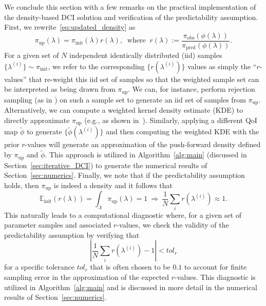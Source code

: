 \documentclass{article}
\newcommand{\tmw}[1]{{\color{red} #1}}
\newcommand{\pspace}{\Lambda}
\newcommand{\initdens}{\pi_{\text{init}}}
\newcommand{\updatedens}{\pi_{\text{up}}}
\newcommand{\predictdens}{\pi_\text{pred}}
\newcommand{\obsdens}{\pi_{\text{obs}}}
\begin{document}
We conclude this section with a few remarks on the practical implementation of the density-based DCI solution and verification 
of the predictability assumption.
First, we rewrite~\eqref{eq:updated_density} as 
\begin{equation}\label{eq:updated_density_r}
    \updatedens(\lambda) = \initdens(\lambda) r(\lambda), \ \text{ where } \ r(\lambda) := \frac{\obsdens(\phi(\lambda))}{\predictdens(\phi(\lambda))}.
\end{equation}
For a given set of $N$ independent identically distributed (iid) samples $\{\lambda^{(i)}\}\sim\initdens$, we refer to the corresponding $\{r(\lambda^{(i)})\}$ values as simply the ``$r$-values'' that re-weight this iid set of samples so that the weighted sample set can be interpreted as being drawn from $\updatedens$.
We can, for instance, perform rejection sampling (as in \cite{BJW18a}) on such a sample set to generate an iid set of samples from $\updatedens$.
Alternatively, we can compute a weighted kernel density estimate (KDE) to directly approximate $\updatedens$ (e.g., as shown in~\cite{RHB25}).
Similarly, applying a different QoI map $\tilde{\phi}$ to generate $\{\tilde{\phi}(\lambda^{(i)})\}$ and then computing the weighted KDE with the prior $r$-values will generate an approximation of the push-forward density defined by $\updatedens$ and $\tilde{\phi}$. 
This approach is utilized in Algorithm~\ref{alg:main} (discussed in Section~\ref{sec:iterative_DCI}) to generate the numerical results of Section~\ref{sec:numerics}.
Finally, we note that if the predictability assumption holds, then $\updatedens$ is indeed a density and it follows that
\begin{equation}
     \mathbb{E}_\text{init}(r(\lambda)) = \int_\pspace \updatedens(\lambda) = 1 \ \Rightarrow \ \frac{1}{N}\sum_i r(\lambda^{(i)}) \approx 1.
\end{equation}
This naturally leads to a computational diagnostic where, for a given set of parameter samples and associated $r$-values, we check the validity of the predictability assumption by verifying that
\begin{equation}\label{eq:diagnostic}
    \left\vert \frac{1}{N}\sum_i r(\lambda^{(i)}) - 1 \right\vert < tol_r
\end{equation}
for a specific tolerance $tol_r$ that is often chosen to be $0.1$ to account for finite sampling error in the approximation of the expected $r$-values.
This diagnostic is utilized in Algorithm~\ref{alg:main} and is discussed in more detail in the numerical results of Section~\ref{sec:numerics}.
\end{document}
